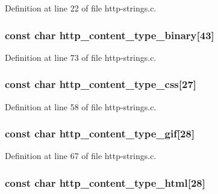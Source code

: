 Definition at line 22 of file http-\/strings.c.

\hypertarget{http-strings_8h_a2ce17b5a8d67c7d96121463bf239ea68}{
\subsubsection[{http\_\-content\_\-type\_\-binary}]{\setlength{\rightskip}{0pt plus 5cm}const char {\bf http\_\-content\_\-type\_\-binary}\mbox{[}43\mbox{]}}}
\label{http-strings_8h_a2ce17b5a8d67c7d96121463bf239ea68}


Definition at line 73 of file http-\/strings.c.

\hypertarget{http-strings_8h_a5475ca39ad42a7477a35e10e34697775}{
\subsubsection[{http\_\-content\_\-type\_\-css}]{\setlength{\rightskip}{0pt plus 5cm}const char {\bf http\_\-content\_\-type\_\-css}\mbox{[}27\mbox{]}}}
\label{http-strings_8h_a5475ca39ad42a7477a35e10e34697775}


Definition at line 58 of file http-\/strings.c.

\hypertarget{http-strings_8h_aef053704ad19e807a1f0f19cb060f3c6}{
\subsubsection[{http\_\-content\_\-type\_\-gif}]{\setlength{\rightskip}{0pt plus 5cm}const char {\bf http\_\-content\_\-type\_\-gif}\mbox{[}28\mbox{]}}}
\label{http-strings_8h_aef053704ad19e807a1f0f19cb060f3c6}


Definition at line 67 of file http-\/strings.c.

\hypertarget{http-strings_8h_a9067d0f43f75f731ec8b6cf5bc937b46}{
\subsubsection[{http\_\-content\_\-type\_\-html}]{\setlength{\rightskip}{0pt plus 5cm}const char {\bf http\_\-content\_\-type\_\-html}\mbox{[}28\mbox{]}}}
\label{http-strings_8h_a9067d0f43f75f731ec8b6cf5bc937b46}


